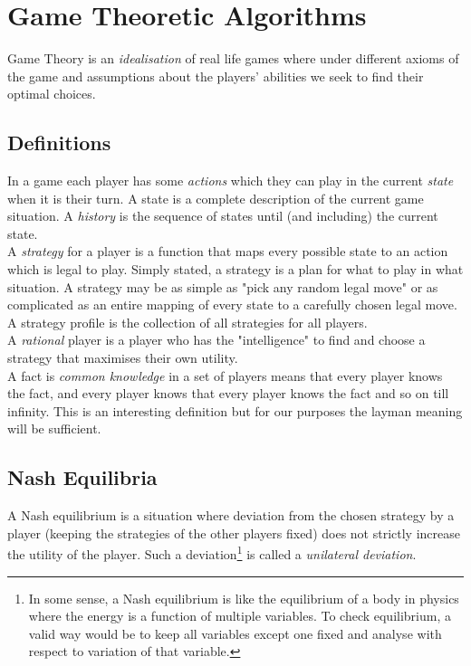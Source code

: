 \chapter{Game Theoretic Algorithms}
Game Theory is an \emph{idealisation} of real life games where under different axioms of the game and 
assumptions about the players' abilities we seek to find their optimal choices. 

\section{Definitions}
In a game each player has some \emph{actions} which they can play in the current \emph{state} when it is their turn. 
A state is a complete description of the current game situation. A \emph{history} is the sequence of 
states until (and including) the current state. \\

\noindent A \emph{strategy} for a player is a function that maps every possible state 
to an action which is legal to play. Simply stated, a strategy is a plan for what to play 
in what situation. A strategy may be as simple as "pick any random legal move" or as complicated 
as an entire mapping of every state to a carefully chosen legal 
move. A strategy profile is the collection of all strategies for all players. \\

\noindent A \emph{rational} player is a player who has the "intelligence" to find and choose a strategy that 
maximises their own utility. \\

\noindent A fact is \emph{common knowledge} in a set of players means that every player knows the 
fact, and every player knows that every player knows the fact and so on till infinity. This is an 
interesting definition but for our purposes the layman meaning will be sufficient.

\section{Nash Equilibria}
A Nash equilibrium is a situation where deviation from 
the chosen strategy by a player (keeping the strategies of the other players fixed) does not 
strictly increase the utility of the player. Such a deviation\footnote{In some sense, 
a Nash equilibrium is like the equilibrium of a body in physics where the energy is a function of multiple variables. To 
check equilibrium, a valid way would be to keep all variables except one fixed and analyse with 
respect to variation of that variable.} is called a \emph{unilateral deviation}. \\

